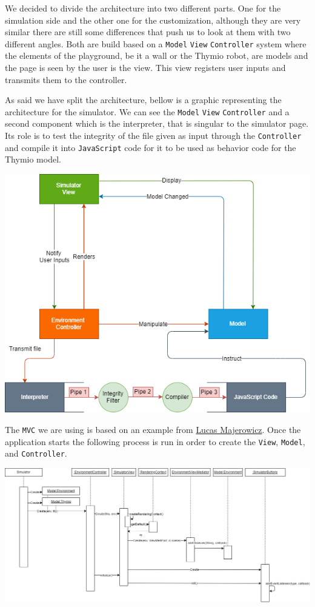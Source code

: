 \documentclass{scrbook}
\begin{document}
We decided to divide the architecture into two different parts. One for the simulation side and the other one for the customization, although they are very similar there are still some differences that push us to look at them with two different angles. Both are build based on a \texttt{Model} \texttt{View} \texttt{Controller} system where the elements of the playground, be it a wall or the Thymio robot, are models and the page is seen by the user is the view. This view registers user inputs and transmits them to the controller. 

As said we have split the architecture, bellow is a graphic representing the architecture for the simulator. We can see the \texttt{Model} \texttt{View} \texttt{Controller} and a second component which is the interpreter, 
that is singular to the simulator page. Its role is to test the integrity of the file given as input through the \texttt{Controller} and compile it into \texttt{JavaScript} code for it to be used as behavior code for the Thymio model.

\begin{center}
  \includegraphics[width=\textwidth]{./architecture_proposal-Page-1}
\end{center}

The \texttt{MVC} we are using is based on an example from \href{https://github.com/lucasmajerowicz/threejs-mvc-example}{Lucas Majerowicz}. Once the application starts the following process is run in order to create the \texttt{View}, \texttt{Model}, and \texttt{Controller}.

\begin{center}
  \includegraphics[width=\textwidth]{./start_app}
\end{center}
\end{document}
